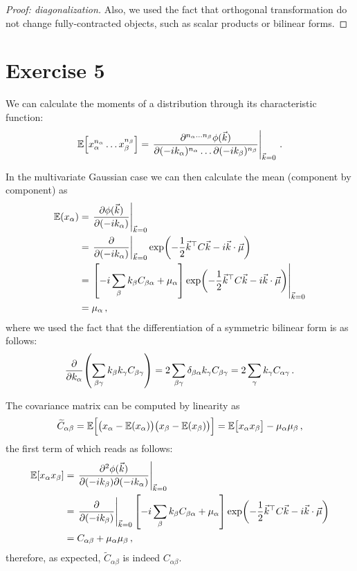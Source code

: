 \documentclass[main.tex]{subfiles}
\begin{document}
\begin{proof}[Proof: diagonalization]
Also, we used the fact that orthogonal transformation do not change fully-contracted objects, such as scalar products or bilinear forms.
\end{proof}

\section{Exercise 5}

We can calculate the moments of a distribution through its characteristic function: 
%
\begin{align}
\mathbb{E} \qty[x_\alpha^{n_\alpha } \dots x_\beta^{n_\beta }]
= \eval{\frac{\partial^{n_\alpha \dots n_\beta } \phi (\vec{k})}{\partial(- i k_\alpha )^{n_\alpha } \dots \partial(-i k_\beta )^{n_\beta }}}_{\vec{k} = 0}
\,.
\end{align}

In the multivariate Gaussian case we can then calculate the mean (component by component) as 
%
\begin{align}
\mathbb{E}(x_\alpha ) &= \eval{\pdv{\phi (\vec{k})}{(-i k_\alpha )}}_{\vec{k} = 0}  \\
&= \eval{\pdv{}{(-i k_\alpha )}}_{\vec{k} = 0}
\exp(- \frac{1}{2} \vec{k}^{\top} C \vec{k} - i \vec{k} \cdot \vec{\mu })  \\
&= \eval{\qty[- i \sum_\beta  k_\beta  C_{\beta  \alpha } + \mu _\alpha ] \exp(- \frac{1}{2} \vec{k}^{\top} C \vec{k} - i \vec{k} \cdot \vec{\mu })}_{\vec{k} = 0}  \\
&= \mu _\alpha 
\,,
\end{align}
%
where we used the fact that the differentiation of a symmetric bilinear form is as follows: 
%
\begin{align}
\pdv{}{k_\alpha } \qty(\sum _{\beta \gamma } k_\beta k_\gamma C_{\beta \gamma }) = 2 \sum _{\beta \gamma } \delta_{\beta \alpha } k_\gamma C_{\beta \gamma } = 2 \sum_{\gamma } k_\gamma C_{\alpha \gamma }
\,.
\end{align}

The covariance matrix can be computed by linearity as
%
\begin{align}
\widetilde{C}_{\alpha \beta } = \mathbb{E}\qty[\qty(x_ \alpha - \mathbb{E}(x_\alpha )) \qty(x_\beta - \mathbb{E}(x_\beta ))] 
= \mathbb{E}\qty[x_\alpha  x_\beta ] - \mu _\alpha \mu _\beta 
\,,
\end{align}
%
the first term of which reads as follows: 
%
\begin{align}
\mathbb{E}[x_\alpha x_\beta ] &= \eval{\pdv[2]{\phi (\vec{k})}{(-i k_\beta  )}{(-i k_\alpha  )}}_{\vec{k} = 0}  \\
&= \eval{\pdv{}{(-i k_\beta )}}_{\vec{k} = 0} \qty[-i \sum _{\beta } k_\beta C_{\beta \alpha } + \mu _\alpha ] \exp(- \frac{1}{2} \vec{k}^{\top} C \vec{k} - i \vec{k} \cdot \vec{\mu })  \\
&= C_{\alpha \beta } + \mu _\alpha \mu _\beta 
\,,
\end{align}
%
therefore, as expected, \(\widetilde{C}_{\alpha \beta }\) is indeed \(C_{\alpha \beta }\). 
\end{document}
